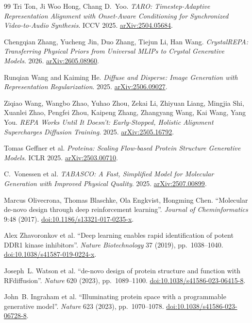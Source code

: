 \documentclass[12pt,a4paper,twoside]{report}
\begin{document}
\begin{thebibliography}{99}
Tri Ton, Ji Woo Hong, Chang D.~Yoo.
\textit{TARO: Timestep-Adaptive Representation Alignment with Onset-Aware Conditioning for Synchronized Video-to-Audio Synthesis}. ICCV 2025.
\href{https://arxiv.org/abs/2504.05684}{arXiv:2504.05684}.

Chengqian Zhang, Yucheng Jin, Duo Zhang, Tiejun Li, Han Wang.
\textit{CrystalREPA: Transferring Physical Priors from Universal MLIPs to Crystal Generative Models}. 2026.
\href{https://arxiv.org/abs/2605.08960}{arXiv:2605.08960}.

Runqian Wang and Kaiming He.
\textit{Diffuse and Disperse: Image Generation with Representation Regularization}. 2025.
\href{https://arxiv.org/abs/2506.09027}{arXiv:2506.09027}.

Ziqiao Wang, Wangbo Zhao, Yuhao Zhou, Zekai Li, Zhiyuan Liang, Mingjia Shi, Xuanlei Zhao, Pengfei Zhou, Kaipeng Zhang, Zhangyang Wang, Kai Wang, Yang You.
\textit{REPA Works Until It Doesn't: Early-Stopped, Holistic Alignment Supercharges Diffusion Training}. 2025.
\href{https://arxiv.org/abs/2505.16792}{arXiv:2505.16792}.


Tomas Geffner et al.
\textit{Proteina: Scaling Flow-based Protein Structure Generative Models}. ICLR 2025.
\href{https://arxiv.org/abs/2503.00710}{arXiv:2503.00710}.

C.~Vonessen et al.
\textit{TABASCO: A Fast, Simplified Model for Molecular Generation with Improved Physical Quality}. 2025.
\href{https://arxiv.org/abs/2507.00899}{arXiv:2507.00899}.


Marcus Olivecrona, Thomas Blaschke, Ola Engkvist, Hongming Chen.
``Molecular de-novo design through deep reinforcement learning''.
\textit{Journal of Cheminformatics} 9:48 (2017).
\href{https://doi.org/10.1186/s13321-017-0235-x}{doi:10.1186/s13321-017-0235-x}.

Alex Zhavoronkov et al.
``Deep learning enables rapid identification of potent DDR1 kinase inhibitors''.
\textit{Nature Biotechnology} 37 (2019), pp.~1038--1040.
\href{https://doi.org/10.1038/s41587-019-0224-x}{doi:10.1038/s41587-019-0224-x}.

Joseph~L. Watson et al.
``de-novo design of protein structure and function with RFdiffusion''.
\textit{Nature} 620 (2023), pp.~1089--1100.
\href{https://doi.org/10.1038/s41586-023-06415-8}{doi:10.1038/s41586-023-06415-8}.

John~B. Ingraham et al.
``Illuminating protein space with a programmable generative model''.
\textit{Nature} 623 (2023), pp.~1070--1078.
\href{https://doi.org/10.1038/s41586-023-06728-8}{doi:10.1038/s41586-023-06728-8}.


\end{thebibliography}
\end{document}
